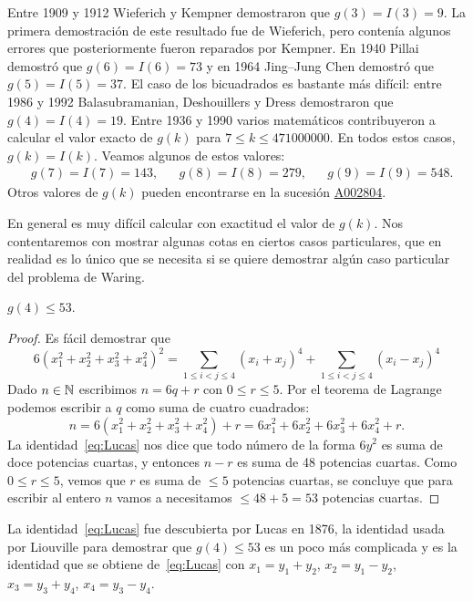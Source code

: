 Entre 1909 y 1912 Wieferich y Kempner demostraron que $g(3)=I(3)=9$.  La
primera demostración de este resultado fue de Wieferich, pero contenía algunos
errores que posteriormente fueron reparados por Kempner.    
En 1940 Pillai
demostró que $g(6)=I(6)=73$ y en 1964 Jing--Jung Chen demostró que
$g(5)=I(5)=37$.  
El caso de los bicuadrados es bastante más difícil: entre 1986
y 1992 Balasubramanian, Deshouillers y Dress demostraron que $g(4)=I(4)=19$.
Entre 1936 y 1990 varios matemáticos contribuyeron a calcular el valor exacto
de $g(k)$ para $7\leq k\leq 471000000$. En todos estos casos, $g(k)=I(k)$.
Veamos algunos de estos valores:
\begin{align*}
	&g(7)=I(7)=143,
	&&g(8)=I(8)=279,
	&&g(9)=I(9)=548.
\end{align*}
Otros valores de $g(k)$ pueden encontrarse en la sucesión
\href{https://oeis.org/A002804}{A002804}.

En general es muy difícil calcular con exactitud el valor de $g(k)$. Nos
contentaremos con mostrar algunas cotas en ciertos casos particulares, que en
realidad es lo único que se necesita si se quiere demostrar algún caso
particular del problema de Waring.

\begin{theorem}[Liouville]
	$g(4)\leq 53$.
\end{theorem}

\begin{proof}
	Es fácil demostrar que
	\begin{equation}
		\label{eq:Lucas}
		6(x_1^2+x_2^2+x_3^2+x_4^2)^2=\sum_{1\leq i<j\leq 4}(x_i+x_j)^4+\sum_{1\leq i<j\leq 4}(x_i-x_j)^4
	\end{equation}
	Dado $n\in\mathbb{N}$ escribimos $n=6q+r$ con $0\leq r\leq 5$. Por el teorema de Lagrange podemos
	escribir a $q$ como suma de cuatro cuadrados:
	\[
		n=6(x_1^2+x_2^2+x_3^2+x_4^2)+r=6x_1^2+6x_2^2+6x_3^2+6x_4^2+r.
	\]
	La identidad~\eqref{eq:Lucas} nos dice que todo número de la forma $6y^2$
	es suma de doce potencias cuartas, y entonces $n-r$ es suma de 48 potencias
	cuartas. Como $0\leq r\leq 5$, vemos que $r$ es suma de $\leq 5$ potencias
	cuartas, se concluye que para escribir al entero $n$ vamos a necesitamos
	$\leq 48+5=53$ potencias cuartas.
\end{proof}

La identidad~\eqref{eq:Lucas} fue descubierta por Lucas en 1876, la identidad
usada por Liouville para demostrar que $g(4)\leq53$ es un poco más complicada y
es la identidad que se obtiene de~\eqref{eq:Lucas} con $x_1=y_1+y_2$,
$x_2=y_1-y_2$, $x_3=y_3+y_4$, $x_4=y_3-y_4$.

